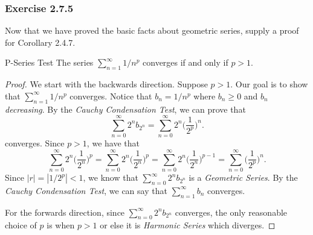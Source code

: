 \subsubsection{Exercise 2.7.5} Now that we have proved the basic facts about geometric series, supply a proof for Corollary 2.4.7.
\begin{cor}{P-Series Test}{}
The series \( \sum_{n=1}^{\infty} 1/n^p \) converges if and only if \( p > 1 \).
\end{cor}
\begin{proof}
    We start with the backwards direction. Suppose \( p > 1 \). Our goal is to show that \( \sum_{n=1}^{\infty} 1/n^p\) converges. Notice that \( b_n = 1/n^p\) where \( b_n \geq 0 \) and \( b_n \)
\textit{decreasing}. By the \textit{Cauchy Condensation Test}, we can prove that 
\[ \sum_{n=0}^{\infty} 2^n b_{2^n} = \sum_{n=0}^{\infty} 2^n \Big( \frac{1}{2^p}\Big)^n.\]
converges. Since \( p > 1 \), we have that 
\[ \sum_{n=0}^{\infty} 2^n \Big( \frac{1}{2^n}\Big)^p = \sum_{n=0}^{\infty} 2^n \Big( \frac{1}{2^n}\Big)^p = \sum_{n=0}^{\infty} 2^n \Big( \frac{1}{2^n}\Big)^{p-1} = \sum_{n=0}^{\infty} \Big(\frac{1}{2^p} \Big)^n.\]
Since \( |r| = |1/2^p| < 1 \), we know that \( \sum_{n=0}^{\infty}2^n b_{2^n}\) is a \textit{Geometric Series}. By the \textit{Cauchy Condensation Test}, we can say that \( \sum_{n=1}^{\infty} b_n \) converges. 

For the forwards direction, since  \(\sum_{n=0}^{\infty} 2^n b_{2^n}\) converges, the only reasonable choice of \( p \) is when \( p > 1 \) or else it is \textit{Harmonic Series} which diverges.
\end{proof}

